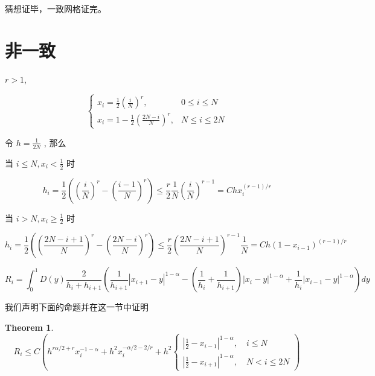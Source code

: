 \documentclass{ctexart}
\newtheorem{theorem}{Theorem}[section]
\theoremstyle{definition}
\theoremstyle{remark}
\numberwithin{equation}{section}
\begin{document}
猜想证毕，一致网格证完。


\section{非一致}

\(r > 1\),

\begin{equation}
    \begin{cases}
        x_i = \frac{1}{2} \left(\frac{i}{N}\right)^r   ,     & 0 \le i \le N  \\
        x_i = 1 - \frac{1}{2} \left(\frac{2N-i}{N}\right)^r, & N \le i \le 2N
    \end{cases}
\end{equation}

令 \(h=\frac{1}{2N}\) , 那么

当 \(i \le N, x_i < \frac{1}{2}\) 时

\begin{equation}
    h_i = \frac{1}{2} \left(\left(\frac{i}{N}\right)^r - \left(\frac{i-1}{N}\right)^r\right)
    \le \frac{r}{2} \frac{1}{N} \left(\frac{i}{N}\right)^{r-1}  = C h x_i^{(r-1)/r}
\end{equation}

当 \(i > N, x_i \ge \frac{1}{2}\) 时

\begin{equation}
    h_i = \frac{1}{2} \left(\left(\frac{2N-i+1}{N}\right)^r - \left(\frac{2N-i}{N}\right)^r\right)
    \le   \frac{r}{2} \left(\frac{2N-i+1}{N}\right)^{r-1} \frac{1}{N} = C h (1-x_{i-1})^{(r-1)/r}
\end{equation}



\begin{equation}
    R_i = \int_0^1 D(y) \frac{2}{h_i + h_{i+1}}
    ( \frac{1}{h_{i+1}} |x_{i+1}-y|^{1-\alpha}
    - (\frac{1}{h_{i}}+\frac{1}{h_{i+1}}) |x_{i}-y|^{1-\alpha}
    +  \frac{1}{h_{i}}|x_{i-1}-y|^{1-\alpha} )  dy
\end{equation}


我们声明下面的命题并在这一节中证明
\begin{theorem}    \label{thm:un-uniform-truncation-error}
    \begin{equation}
        R_i \le C(h^{r\alpha/2+r}x_i^{-1-\alpha} + h^2 x_i^{-\alpha/2-2/r} + h^2
        \begin{cases}
            |\frac{1}{2}-x_{i-1}|^{1-\alpha}, \quad i\le N \\
            |\frac{1}{2}-x_{i+1}|^{1-\alpha} , \quad N<i\le 2N
        \end{cases})
    \end{equation}
\end{theorem}
\end{document}
